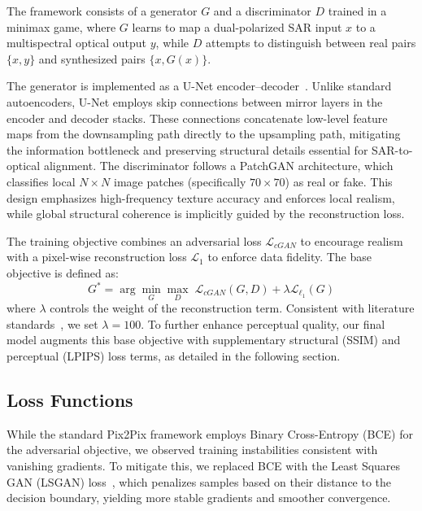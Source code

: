 \documentclass[remotesensing,article,submit,pdftex,moreauthors]{Definitions/mdpi}
\begin{document}
The framework consists of a generator $G$ and a discriminator $D$ trained in a minimax game, where $G$ learns to map a dual-polarized SAR input $x$ to a multispectral optical output $y$, while $D$ attempts to distinguish between real pairs $\{x, y\}$ and synthesized pairs $\{x, G(x)\}$.

The generator is implemented as a U-Net encoder--decoder~\cite{U_net_2015}. Unlike standard autoencoders, U-Net employs skip connections between mirror layers in the encoder and decoder stacks. These connections concatenate low-level feature maps from the downsampling path directly to the upsampling path, mitigating the information bottleneck and preserving structural details essential for SAR-to-optical alignment. The discriminator follows a PatchGAN architecture, which classifies local $N \times N$ image patches (specifically $70 \times 70$) as real or fake. This design emphasizes high-frequency texture accuracy and enforces local realism, while global structural coherence is implicitly guided by the reconstruction loss.

The training objective combines an adversarial loss $\mathcal{L}_{cGAN}$ to encourage realism with a pixel-wise reconstruction loss $\mathcal{L}_{1}$ to enforce data fidelity. The base objective is defined as:
\begin{equation}
    G^* = \arg \min_G \max_D \; \mathcal{L}_{cGAN}(G,D) + \lambda \mathcal{L}_{\ell_1}(G)
\end{equation}
where $\lambda$ controls the weight of the reconstruction term. Consistent with literature standards~\cite{pix2pix_2018, A_cGAN_fuse_sar_MS_CR}, we set $\lambda = 100$. To further enhance perceptual quality, our final model augments this base objective with supplementary structural (SSIM) and perceptual (LPIPS) loss terms, as detailed in the following section.

\subsection{Loss Functions}
\label{subsec:losses}
While the standard Pix2Pix framework employs Binary Cross-Entropy (BCE) for the adversarial objective, we observed training instabilities consistent with vanishing gradients. To mitigate this, we replaced BCE with the Least Squares GAN (LSGAN) loss~\cite{ls_gan}, which penalizes samples based on their distance to the decision boundary, yielding more stable gradients and smoother convergence.
\end{document}
